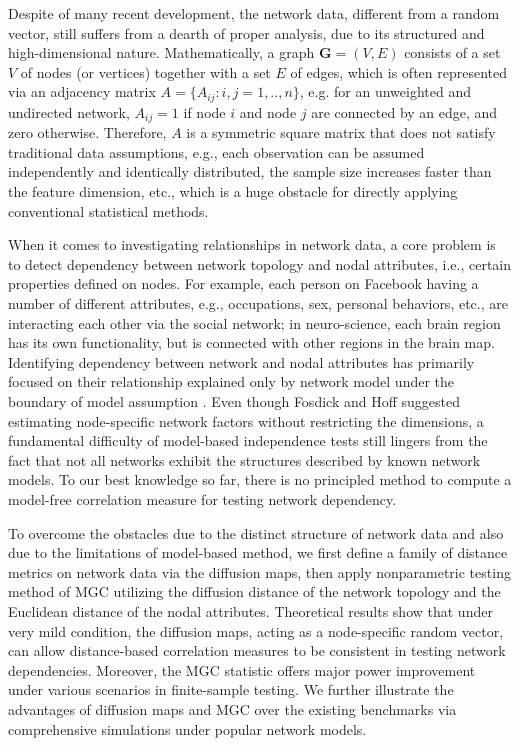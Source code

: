 \documentclass[11pt]{article}
\theoremstyle{definition}
\begin{document}
Despite of many recent development, the network data, different from a random vector, still suffers from a dearth of proper analysis, due to its structured and high-dimensional nature. Mathematically, a graph $\mathbf{G}=(V,E)$ consists of a set $V$ of nodes (or vertices) together with a set $E$ of edges, which is often represented via an adjacency matrix $A = \{A_{ij} : i,j= 1,..,n \}$, e.g. for an unweighted and undirected network, $A_{ij} = 1$ if node $i$ and node $j$ are connected by an edge, and zero otherwise. Therefore, $A$ is a symmetric square matrix that does not satisfy traditional data assumptions, e.g., each observation can be assumed independently and identically distributed, the sample size increases faster than the feature dimension, etc., which is a huge obstacle for directly applying conventional statistical methods. 

When it comes to investigating relationships in network data, a core problem is to detect dependency between network topology and nodal attributes, i.e., certain properties defined on nodes. For example, each person on Facebook having a number of different attributes, e.g., occupations, sex, personal behaviors, etc., are interacting each other via the social network; in neuro-science, each brain region has its own functionality, but is connected with other regions in the brain map. Identifying dependency between network and nodal attributes has primarily focused on their relationship explained only by network model under the boundary of model assumption \citep{wasserman1996logit, howard2016understanding, fosdick2015testing}. Even though Fosdick and Hoff \cite{fosdick2015testing} suggested estimating node-specific network factors without restricting the dimensions, a fundamental difficulty of model-based independence tests still lingers from the fact that not all networks exhibit the structures described by known network models. To our best knowledge so far, there is no principled method to compute a model-free correlation measure for testing network dependency. 

To overcome the obstacles due to the distinct structure of network data and also due to the limitations of model-based method, we first define a family of distance metrics on network data via the diffusion maps, then apply nonparametric testing method of MGC utilizing the diffusion distance of the network topology and the Euclidean distance of the nodal attributes. Theoretical results show that under very mild condition, the diffusion maps, acting as a node-specific random vector, can allow distance-based correlation measures to be consistent in testing network dependencies. Moreover, the MGC statistic offers major power improvement under various scenarios in finite-sample testing. We further illustrate the advantages of diffusion maps and MGC over the existing benchmarks via comprehensive simulations under popular network models.
\end{document}

